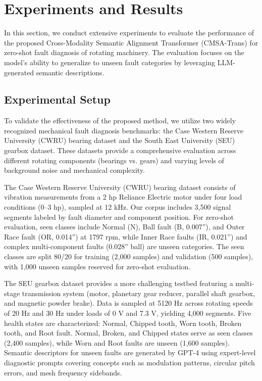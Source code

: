 \section{Experiments and Results}
In this section, we conduct extensive experiments to evaluate the performance of the proposed Cross-Modality Semantic Alignment Transformer (CMSA-Trans) for zero-shot fault diagnosis of rotating machinery. The evaluation focuses on the model's ability to generalize to unseen fault categories by leveraging LLM-generated semantic descriptions.

\subsection{Experimental Setup}
To validate the effectiveness of the proposed method, we utilize two widely recognized mechanical fault diagnosis benchmarks: the Case Western Reserve University (CWRU) bearing dataset and the South East University (SEU) gearbox dataset. These datasets provide a comprehensive evaluation across different rotating components (bearings vs. gears) and varying levels of background noise and mechanical complexity.

The Case Western Reserve University (CWRU) bearing dataset consists of vibration measurements from a 2 hp Reliance Electric motor under four load conditions (0--3 hp), sampled at 12 kHz. Our corpus includes 3,500 signal segments labeled by fault diameter and component position. For zero-shot evaluation, seen classes include Normal (N), Ball fault (B, 0.007''), and Outer Race fault (OR, 0.014'') at 1797 rpm, while Inner Race faults (IR, 0.021'') and complex multi-component faults (0.028'' ball) are unseen categories. The seen classes are split 80/20 for training (2,000 samples) and validation (500 samples), with 1,000 unseen samples reserved for zero-shot evaluation.

The SEU gearbox dataset provides a more challenging testbed featuring a multi-stage transmission system (motor, planetary gear reducer, parallel shaft gearbox, and magnetic powder brake). Data is sampled at 5120 Hz across rotating speeds of 20 Hz and 30 Hz under loads of 0 V and 7.3 V, yielding 4,000 segments. Five health states are characterized: Normal, Chipped tooth, Worn tooth, Broken tooth, and Root fault. Normal, Broken, and Chipped states serve as seen classes (2,400 samples), while Worn and Root faults are unseen (1,600 samples). Semantic descriptors for unseen faults are generated by GPT-4 using expert-level diagnostic prompts covering concepts such as modulation patterns, circular pitch errors, and mesh frequency sidebands.

